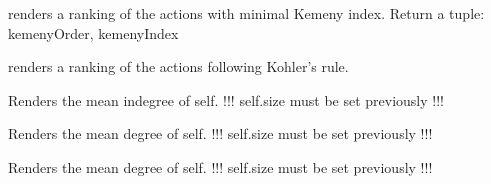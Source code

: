 \documentclass[letterpaper,10pt,english]{sphinxmanual}
\begin{document}
\begin{fulllineitems}
\begin{fulllineitems}
\end{fulllineitems}


\begin{fulllineitems}
\label{techDoc:digraphs.Digraph.computeKemenyOrder}
renders a ranking of the actions with minimal Kemeny index.
Return a tuple: kemenyOrder, kemenyIndex

\end{fulllineitems}


\begin{fulllineitems}
\label{techDoc:digraphs.Digraph.computeKohlerRanking}
renders a ranking of the actions following Kohler's rule.

\end{fulllineitems}


\begin{fulllineitems}
\label{techDoc:digraphs.Digraph.computeMeanInDegree}
Renders the mean indegree of self.
!!! self.size must be set previously !!!

\end{fulllineitems}


\begin{fulllineitems}
\label{techDoc:digraphs.Digraph.computeMeanOutDegree}
Renders the mean degree of self.
!!! self.size must be set previously !!!

\end{fulllineitems}


\begin{fulllineitems}
\label{techDoc:digraphs.Digraph.computeMeanSymDegree}
Renders the mean degree of self.
!!! self.size must be set previously !!!


\end{fulllineitems}
\end{fulllineitems}
\end{document}
